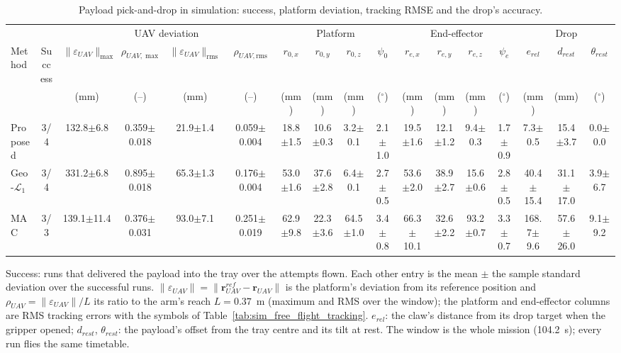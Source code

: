 \begin{table}[H]
\centering
\caption{Payload pick-and-drop in simulation: success, platform deviation, tracking RMSE and the drop's accuracy.}
\label{tab:sim_pick_drop}
\footnotesize
\setlength{\tabcolsep}{2.5pt}
\begin{threeparttable}
\begin{tabular}{l c c c c c c c c c c c c c c c c}
\toprule
& & \multicolumn{4}{c}{UAV deviation} & \multicolumn{4}{c}{Platform} & \multicolumn{4}{c}{End-effector} & \multicolumn{3}{c}{Drop} \\
\cmidrule(lr){3-6} \cmidrule(lr){7-10} \cmidrule(lr){11-14} \cmidrule(lr){15-17}
Method & Success & $\|\varepsilon_{UAV}\|_{\max}$ & $\rho_{UAV,\max}$ & $\|\varepsilon_{UAV}\|_{\mathrm{rms}}$ & $\rho_{UAV,\mathrm{rms}}$ & $r_{0,x}$ & $r_{0,y}$ & $r_{0,z}$ & $\psi_0$ & $r_{e,x}$ & $r_{e,y}$ & $r_{e,z}$ & $\psi_e$ & $e_{rel}$ & $d_{rest}$ & $\theta_{rest}$ \\
 & & (mm) & (--) & (mm) & (--) & (mm) & (mm) & (mm) & ($^\circ$) & (mm) & (mm) & (mm) & ($^\circ$) & (mm) & (mm) & ($^\circ$) \\
\midrule
Proposed & 3/4 & 132.8$\pm$6.8 & 0.359$\pm$0.018 & 21.9$\pm$1.4 & 0.059$\pm$0.004 & 18.8$\pm$1.5 & 10.6$\pm$0.3 & 3.2$\pm$0.1 & 2.1$\pm$1.0 & 19.5$\pm$1.6 & 12.1$\pm$1.2 & 9.4$\pm$0.3 & 1.7$\pm$0.9 & 7.3$\pm$0.5 & 15.4$\pm$3.7 & 0.0$\pm$0.0 \\
Geo-$\mathcal{L}_1$~\cite{cai2025experiment} & 3/4 & 331.2$\pm$6.8 & 0.895$\pm$0.018 & 65.3$\pm$1.3 & 0.176$\pm$0.004 & 53.0$\pm$1.6 & 37.6$\pm$2.8 & 6.4$\pm$0.1 & 2.7$\pm$0.5 & 53.6$\pm$2.0 & 38.9$\pm$2.7 & 15.6$\pm$0.6 & 2.8$\pm$0.5 & 40.4$\pm$15.4 & 31.1$\pm$17.0 & 3.9$\pm$6.7 \\
MAC~\cite{yadav2024modular} & 3/3 & 139.1$\pm$11.4 & 0.376$\pm$0.031 & 93.0$\pm$7.1 & 0.251$\pm$0.019 & 62.9$\pm$9.8 & 22.3$\pm$3.6 & 64.5$\pm$1.0 & 3.4$\pm$0.8 & 66.3$\pm$10.1 & 32.6$\pm$2.2 & 93.2$\pm$0.7 & 3.3$\pm$0.7 & 168.7$\pm$9.6 & 57.6$\pm$26.0 & 9.1$\pm$9.2 \\
\bottomrule
\end{tabular}
\begin{tablenotes}
\footnotesize
\item[] Success: runs that delivered the payload into the tray over the attempts flown. Each other entry is the mean $\pm$ the sample standard deviation over the successful runs. $\|\varepsilon_{UAV}\| = \|\boldsymbol{r}_{UAV}^{ref} - \boldsymbol{r}_{UAV}\|$ is the platform's deviation from its reference position and $\rho_{UAV} = \|\varepsilon_{UAV}\|/L$ its ratio to the arm's reach $L = 0.37$~m (maximum and RMS over the window); the platform and end-effector columns are RMS tracking errors with the symbols of Table~\ref{tab:sim_free_flight_tracking}. $e_{rel}$: the claw's distance from its drop target when the gripper opened; $d_{rest}$, $\theta_{rest}$: the payload's offset from the tray centre and its tilt at rest. The window is the whole mission (104.2~s); every run flies the same timetable.
\end{tablenotes}
\end{threeparttable}
\end{table}
